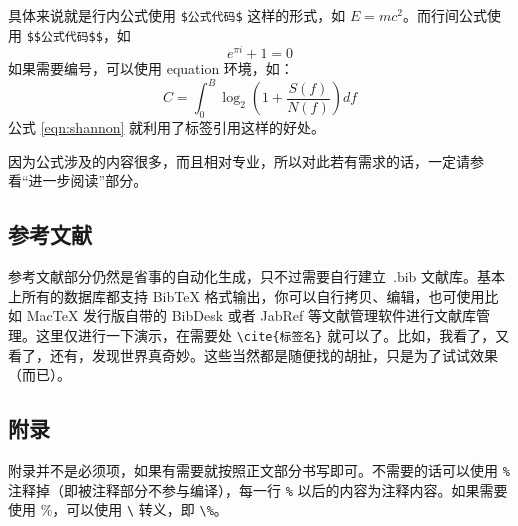 具体来说就是行内公式使用 \verb|$公式代码$| 这样的形式，如 $E=mc^2$。而行间公式使用 \verb|$$公式代码$$|，如
$$e^{\pi i}+1=0$$
如果需要编号，可以使用 equation 环境，如：
\begin{equation}
	C=\int^B_0\log_2(1+\frac{S(f)}{N(f)})df
	\label{eqn:shannon}
\end{equation}
公式 \eqref{eqn:shannon} 就利用了标签引用这样的好处。

因为公式涉及的内容很多，而且相对专业，所以对此若有需求的话，一定请参看“进一步阅读”部分。

\subsection{参考文献}
参考文献部分仍然是省事的自动化生成，只不过需要自行建立~.bib 文献库。基本上所有的数据库都支持 BibTeX 格式输出，你可以自行拷贝、编辑，也可使用比如 MacTeX 发行版自带的 BibDesk 或者 JabRef 等文献管理软件进行文献库管理。这里仅进行一下演示，在需要处 \verb|\cite{标签名}| 就可以了。比如，我看了\cite{ref1}，又看了\cite{ref2}，还有\cite{ref3,ref4}，发现世界真奇妙\cite{ref3}。这些当然都是随便找的胡扯，只是为了试试效果（而已）。

\subsection{附录}
附录并不是必须项，如果有需要就按照正文部分书写即可。不需要的话可以使用 \verb|%| 注释掉（即被注释部分不参与编译），每一行 \verb|%| 以后的内容为注释内容。如果需要使用 \%，可以使用 \verb|\| 转义，即 \verb|\%|。
